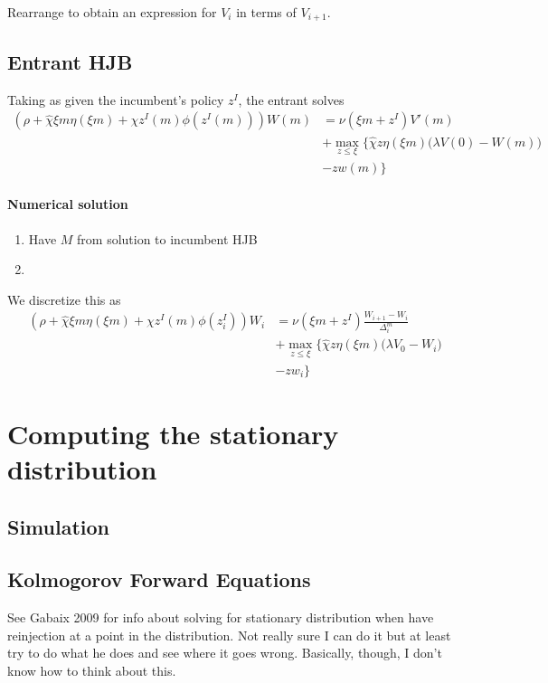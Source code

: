 \documentclass[12pt,english]{article}
\theoremstyle{remark}
\begin{document}
Rearrange to obtain an expression for $V_i$ in terms of $V_{i+1}$. 

\subsection{Entrant HJB}
Taking as given the incumbent's policy $z^I$, the entrant solves
\begin{align}
	(\rho + \hat{\chi} \xi m \eta (\xi m) + \chi z^I(m) \phi (z^I(m))) W(m) &= \nu (\xi m + z^I) V'(m) \nonumber \\
	&+ \max_{z \le \xi} \Big\{ \hat{\chi} z \eta (\xi m) \Big( \lambda V(0) - W(m) \Big) \nonumber \\
	&- zw(m) \Big\}
\end{align}

\paragraph{Numerical solution}
\begin{enumerate}
	\item Have $M$ from solution to incumbent HJB
	\item 
\end{enumerate}
We discretize this as 
\begin{align}
	(\rho + \hat{\chi} \xi m \eta (\xi m) + \chi z^I(m) \phi (z^I_i)) W_i &= \nu (\xi m + z^I) \frac{W_{i+1}-W_i}{\Delta^m_i} \nonumber \\
&+ \max_{z \le \xi} \Big\{ \hat{\chi} z \eta (\xi m) \Big( \lambda V_0 - W_i \Big) \nonumber \\
&- zw_i \Big\}
\end{align}


\section{Computing the stationary distribution}

\subsection{Simulation}

\subsection{Kolmogorov Forward Equations}

See Gabaix 2009 for info about solving for stationary distribution when have reinjection at a point in the distribution. Not really sure I can do it but at least try to do what he does and see where it goes wrong. Basically, though, I don't know how to think about this.
\end{document}
